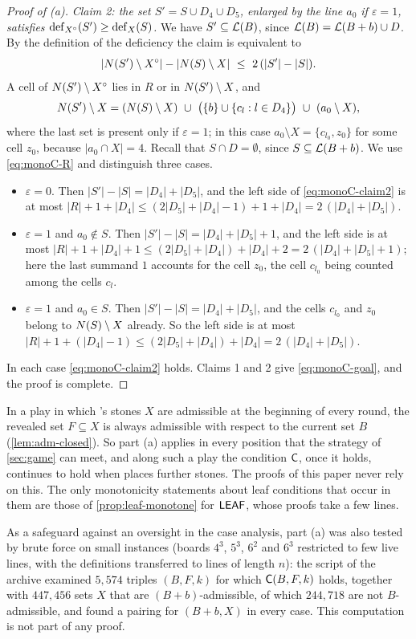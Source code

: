 \begin{proof}[Proof of \textup{(a)}]
\smallskip\noindent\emph{Claim 2: the set
$S'=S\cup D_4\cup D_5$, enlarged by the line $a_0$ if $\varepsilon=1$, satisfies
$\operatorname{def}_{X^\circ}(S')\ge\operatorname{def}_X(S)$.}
We have $S'\subseteq\mathcal{L}(B)$, since $\mathcal{L}(B)=\mathcal{L}(B+b)\cup D$. By the definition of the deficiency the
claim is equivalent to
\begin{equation}\label{eq:monoC-claim2}
  |N(S')\setminus X^\circ|-|N(S)\setminus X|\ \le\ 2\,(|S'|-|S|) .
\end{equation}
A cell of $N(S')\setminus X^\circ$ lies in $R$ or in $N(S')\setminus X$, and
\[
  \N(S')\setminus X=(\N(S)\setminus X)\ \cup\ \bigl(\{b\}\cup\{c_l : l\in D_4\}\bigr)\ \cup\ (a_0\setminus X),
\]
where the last set is present only if $\varepsilon=1$; in this case $a_0\setminus X=\{c_{l_0},z_0\}$ for
some cell $z_0$, because $|a_0\cap X|=4$. Recall that $S\cap D=\emptyset$, since $S\subseteq\mathcal{L}(B+b)$. We
use \eqref{eq:monoC-R} and distinguish three cases.
\begin{itemize}
\item $\varepsilon=0$. Then $|S'|-|S|=|D_4|+|D_5|$, and the left side of \eqref{eq:monoC-claim2} is at most
      $|R|+1+|D_4|\le(2|D_5|+|D_4|-1)+1+|D_4|=2\,(|D_4|+|D_5|)$.
\item $\varepsilon=1$ and $a_0\notin S$. Then $|S'|-|S|=|D_4|+|D_5|+1$, and the left side is at most
      $|R|+1+|D_4|+1\le(2|D_5|+|D_4|)+|D_4|+2=2\,(|D_4|+|D_5|+1)$; here the last summand $1$ accounts for
      the cell $z_0$, the cell $c_{l_0}$ being counted among the cells $c_l$.
\item $\varepsilon=1$ and $a_0\in S$. Then $|S'|-|S|=|D_4|+|D_5|$, and the cells $c_{l_0}$ and $z_0$ belong
      to $N(S)\setminus X$ already. So the left side is at most
      $|R|+1+(|D_4|-1)\le(2|D_5|+|D_4|)+|D_4|=2\,(|D_4|+|D_5|)$.
\end{itemize}
In each case \eqref{eq:monoC-claim2} holds. Claims 1 and 2 give \eqref{eq:monoC-goal}, and the proof is
complete.
\end{proof}

In a play in which \Maker's stones $X$ are admissible at the beginning of every round, the revealed set
$F\subseteq X$ is always admissible with respect to the current set $B$ (\cref{lem:adm-closed}). So part
(a) applies in every position that the strategy of \cref{sec:game} can meet, and along such a play the
condition $\mathsf{C}$, once it holds, continues to hold when \Breaker{} places further stones. The proofs of this
paper never rely on this. The only monotonicity statements about leaf conditions that occur in them
are those of \cref{prop:leaf-monotone} for $\mathsf{LEAF}$, whose proofs take a few lines.

As a safeguard against an oversight in the case analysis, part (a) was also tested by brute force on
small instances (boards $4^3$, $5^3$, $6^2$ and $6^3$ restricted to few live lines, with the definitions
transferred to lines of length $n$): the script  of the archive examined $5{,}574$ triples
$(B,F,k)$ for which $\mathsf{C}(B,F,k)$ holds, together with $447{,}456$ sets $X$ that are $(B+b)$-admissible, of
which $244{,}718$ are not $B$-admissible, and found a pairing for $(B+b,X)$ in every case. This
computation is not part of any proof.
